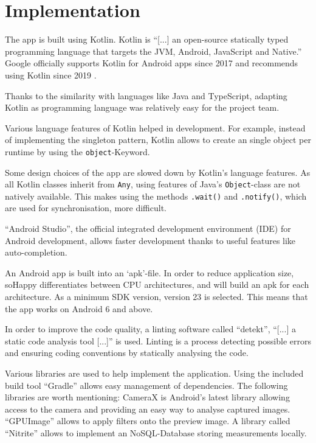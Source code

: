 \section{Implementation} \label{sec:implementation}

The app is built using Kotlin. Kotlin is ``[...] an open-source statically 
typed programming language that targets the JVM, Android, JavaScript and 
Native.'' \cite{kotlin2020}
Google officially supports Kotlin for Android apps since 2017
\cite{googleio2017} and recommends using Kotlin since 2019
\cite{androidkotlin2019}.

Thanks to the similarity with languages like Java and TypeScript, adapting
Kotlin as programming language was relatively easy for the project team.

Various language features of Kotlin helped in development. For example, instead of
implementing the singleton pattern, Kotlin allows to create an single object
per runtime by using the \texttt{object}-Keyword.

Some design choices of the app are slowed down by Kotlin's language features.
As all Kotlin classes inherit from \texttt{Any}, using features of Java's 
\texttt{Object}-class are not natively available. This makes using the methods
\texttt{.wait()} and \texttt{.notify()}, which are used for synchronisation,
more difficult.

``Android Studio'', the official integrated development environment 
(IDE) for Android development, allows faster development thanks to useful
features like auto-completion. 

An Android app is built into an `apk'-file. In order to reduce application
size, soHappy differentiates between CPU architectures, and will
build an apk for each architecture. As a minimum SDK version, version 23
is selected. This means that the app works on Android 6 and above.

In order to improve the code quality, a linting software called ``detekt'',
``[...] a static code analysis tool [...]''\cite{detekt2020} is used.
Linting is a process detecting possible errors and ensuring coding conventions
by statically analysing the code.

Various libraries are used to help implement the application. Using
the included build tool ``Gradle'' \cite{gradle} allows easy management of 
dependencies. The following libraries are worth mentioning: CameraX 
\cite{camerax} is Android's latest library allowing access to the camera and 
providing an easy way to analyse captured images. ``GPUImage'' \cite{gpuimage}
allows to apply filters onto the preview image. A library called ``Nitrite''
\cite{nitrite} allows to implement an NoSQL-Database storing measurements
locally.

